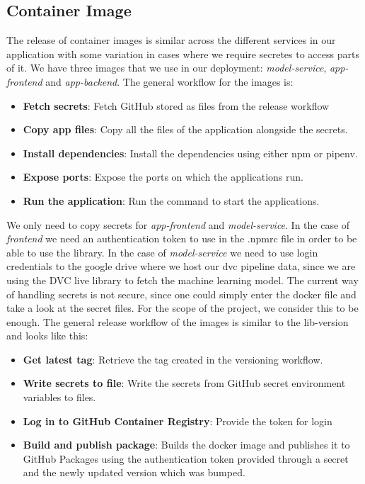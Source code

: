 \subsection{Container Image}
The release of container images is similar across the different services in our application with some variation in cases where we require secretes to access parts of it. We have three images that we use in our deployment: \emph{model-service}, \emph{app-frontend} and \emph{app-backend}. The general workflow for the images is:
\begin{itemize}
    \item \textbf{Fetch secrets}: Fetch GitHub stored as files from the release workflow
    \item \textbf{Copy app files}: Copy all the files of the application alongside the secrets.
    \item \textbf{Install dependencies}: Install the dependencies using either npm or pipenv.
    \item \textbf{Expose ports}: Expose the ports on which the applications run.
    \item \textbf{Run the application}: Run the command to start the applications.
\end{itemize}
We only need to copy secrets for \emph{app-frontend} and \emph{model-service}. In the case of \emph{frontend} we need an authentication token to use in the .npmrc file in order to be able to use the library. In the case of \emph{model-service} we need to use login credentials to the google drive where we host our dvc pipeline data, since we are using the DVC live library to fetch the machine learning model. The current way of handling secrets is not secure, since one could simply enter the docker file and take a look at the secret files. For the scope of the project, we consider this to be enough. The general release workflow of the images is similar to the lib-version and looks like this:
\begin{itemize}
    \item \textbf{Get latest tag}: Retrieve the tag created in the versioning workflow.
    \item \textbf{Write secrets to file}: Write the secrets from GitHub secret environment variables to files.
    \item \textbf{Log in to GitHub Container Registry}: Provide the token for login
    \item \textbf{Build and publish package}: Builds the docker image and publishes it to GitHub Packages using the authentication token provided through a secret and the newly updated version which was bumped.
\end{itemize}
